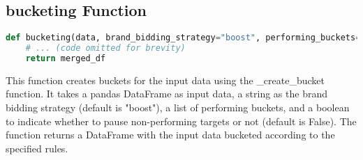 \subsection{bucketing Function}

\begin{lstlisting}[language=Python]
def bucketing(data, brand_bidding_strategy="boost", performing_buckets=None, pause_non_performing_targets=False):
    # ... (code omitted for brevity)
    return merged_df
\end{lstlisting}

This function creates buckets for the input data using the \_create\_bucket function. It takes a pandas DataFrame as input data, a string as the brand bidding strategy (default is "boost"), a list of performing buckets, and a boolean to indicate whether to pause non-performing targets or not (default is False). The function returns a DataFrame with the input data bucketed according to the specified rules.